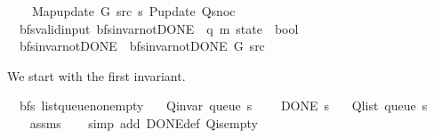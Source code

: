 \begin{isabellebody}
\ \ \ \ Map{\isacharunderscore}{\kern0pt}update\ G\ src\ s\ P{\isacharunderscore}{\kern0pt}update\ Q{\isacharunderscore}{\kern0pt}snoc{\isachardoublequoteclose}\isanewline
\isanewline
{}\isamarkupfalse%
\ {\isacharparenleft}{\kern0pt}\ bfs{\isacharunderscore}{\kern0pt}valid{\isacharunderscore}{\kern0pt}input{\isacharparenright}{\kern0pt}\ bfs{\isacharunderscore}{\kern0pt}invar{\isacharunderscore}{\kern0pt}not{\isacharunderscore}{\kern0pt}DONE{\isacharprime}{\kern0pt}{\isacharprime}{\kern0pt}\ {\isacharcolon}{\kern0pt}{\isacharcolon}{\kern0pt}\ {\isachardoublequoteopen}{\isacharparenleft}{\kern0pt}{\isacharprime}{\kern0pt}q{\isacharcomma}{\kern0pt}\ {\isacharprime}{\kern0pt}m{\isacharparenright}{\kern0pt}\ state\ {\isasymRightarrow}\ bool{\isachardoublequoteclose}\ \isanewline
\ \ {\isachardoublequoteopen}bfs{\isacharunderscore}{\kern0pt}invar{\isacharunderscore}{\kern0pt}not{\isacharunderscore}{\kern0pt}DONE{\isacharprime}{\kern0pt}{\isacharprime}{\kern0pt}\ {\isasymequiv}\ bfs{\isacharunderscore}{\kern0pt}invar{\isacharunderscore}{\kern0pt}not{\isacharunderscore}{\kern0pt}DONE{\isacharprime}{\kern0pt}\ G\ src{\isachardoublequoteclose}%
\begin{isamarkuptext}%
We start with the first invariant.%
\end{isamarkuptext}\isamarkuptrue%
\isamarkupfalse%
\ {\isacharparenleft}{\kern0pt}\ bfs{\isacharparenright}{\kern0pt}\ list{\isacharunderscore}{\kern0pt}queue{\isacharunderscore}{\kern0pt}non{\isacharunderscore}{\kern0pt}empty{\isacharcolon}{\kern0pt}\isanewline
\ \ \ {\isachardoublequoteopen}Q{\isacharunderscore}{\kern0pt}invar\ {\isacharparenleft}{\kern0pt}queue\ s{\isacharparenright}{\kern0pt}{\isachardoublequoteclose}\isanewline
\ \ \ {\isachardoublequoteopen}{\isasymnot}\ DONE\ s{\isachardoublequoteclose}\isanewline
\ \ \ {\isachardoublequoteopen}Q{\isacharunderscore}{\kern0pt}list\ {\isacharparenleft}{\kern0pt}queue\ s{\isacharparenright}{\kern0pt}\ {\isasymnoteq}\ {\isacharbrackleft}{\kern0pt}{\isacharbrackright}{\kern0pt}{\isachardoublequoteclose}\isanewline
%
\isadelimproof
\ \ %
\endisadelimproof
%
\isatagproof
{}\isamarkupfalse%
\ assms\isanewline
\ \ \isamarkupfalse%
\ {\isacharparenleft}{\kern0pt}simp\ add{\isacharcolon}{\kern0pt}\ DONE{\isacharunderscore}{\kern0pt}def\ Q{\isachardot}{\kern0pt}is{\isacharunderscore}{\kern0pt}empty{\isacharparenright}{\kern0pt}%
\endisatagproof
{\isafoldproof}%
%
\isadelimproof

\end{isabellebody}
